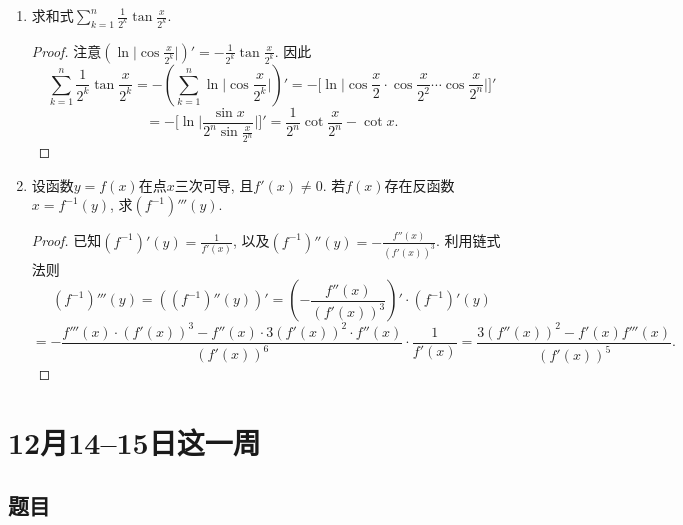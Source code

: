 \documentclass[UTF8,11pt, a4paper, oneside, fontset=none]{ctexbook}
\begin{document}
\begin{enumerate}
\item 求和式$\sum_{k=1}^n \frac{1}{2^k} \tan \frac{x}{2^k} $.

\begin{proof}
注意$\left( \ln \Big| \cos \frac{x}{2^k}\Big|\right)' = - \frac{1}{2^k} \tan \frac{x}{2^k} $. 因此
\[
\sum_{k=1}^n \frac{1}{2^k} \tan \frac{x}{2^k} = - \left( \sum_{k=1}^n  \ln \Big| \cos \frac{x}{2^k}\Big|\right)' = - \Big[ \ln \Big| \cos \frac{x}{2} \cdot \cos \frac{x}{2^2} \cdots \cos \frac{x}{2^n} \Big| \Big]'
\]
\[
= -\Big[ \ln \Big| \frac{\sin x}{2^n \sin \frac{x}{2^n}} \Big| \Big]' = \frac{1}{2^n} \cot \frac{x}{2^n} - \cot x.
\]
\end{proof}

\item 设函数$y = f(x)$在点$x$三次可导, 且$f'(x) \neq 0$. 若$f(x)$存在反函数$x = f^{-1}(y)$, 求$(f^{-1})'''(y)$.


\begin{proof}

已知$(f^{-1})'(y ) = \frac{1}{f'(x)}$, 以及$(f^{-1})''(y ) = - \frac{f''(x)}{(f'(x))^3}$. 利用链式法则
\[
(f^{-1})'''(y ) = ((f^{-1})''(y ))' = \left(- \frac{f''(x)}{(f'(x))^3} \right)' \cdot (f^{-1})'(y ) 
\]
\[
= - \frac{ f'''(x) \cdot (f'(x))^3 - f''(x) \cdot 3 (f'(x))^2 \cdot f''(x)        }{(f'(x))^6} \cdot \frac{1}{f'(x)} = \frac{3(f''(x))^2 - f'(x) f'''(x)}{(f'(x))^5}.
\]


\end{proof}
\end{enumerate}

\clearpage

\section{12月14--15日这一周}

\subsection*{题目}
\end{document}
